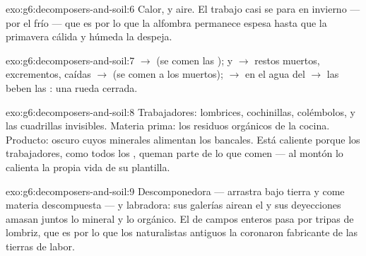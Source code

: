 \begin{solution}{exo:g6:decomposers-and-soil:6}
Calor,  y aire. El trabajo casi se para en invierno --- por el
frío --- que es por lo que la alfombra permanece espesa hasta que la
primavera cálida y húmeda la despeja.
\end{solution}

\begin{solution}{exo:g6:decomposers-and-soil:7}
 $\rightarrow$  (se comen las );
 y  $\rightarrow$ restos muertos, excrementos,
 caídas $\rightarrow$  (se comen a los muertos);
 $\rightarrow$  en el agua del 
$\rightarrow$ las beben las : una rueda cerrada.
\end{solution}

\begin{solution}{exo:g6:decomposers-and-soil:8}
Trabajadores: lombrices, cochinillas, colémbolos,  y las
cuadrillas invisibles. Materia prima: los residuos orgánicos de la
cocina. Producto:  oscuro cuyos minerales alimentan los bancales.
Está caliente porque los trabajadores, como todos los ,
queman parte de lo que comen --- al montón lo calienta la propia vida
de su plantilla.
\end{solution}

\begin{solution}{exo:g6:decomposers-and-soil:9}
Descomponedora --- arrastra  bajo tierra y come materia
descompuesta --- y labradora: sus galerías airean el  y sus
deyecciones amasan juntos lo mineral y lo orgánico. El  de campos
enteros pasa por tripas de lombriz, que es por lo que los naturalistas
antiguos la coronaron fabricante de las tierras de labor.
\end{solution}

